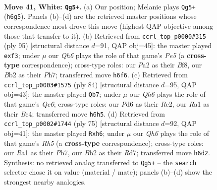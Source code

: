 \documentclass[11pt]{article}
\begin{document}
\clearpage

\begin{figure}[p]\centering
\begin{subfigure}{0.46\textwidth}\centering
\resizebox{\linewidth}{!}{%
\newchessgame
\chessboard[
  setfen={3q2k1/1b1n1p2/3P1n1Q/2p4p/p6P/5pP1/PB6/R5K1 w - - 2 41},
  showmover=false,
  pgfstyle=straightmove, color=movearrow, markmove={h6-g5}
]}
\caption{}
\end{subfigure}\hfill
\begin{subfigure}{0.46\textwidth}\centering
\resizebox{\linewidth}{!}{%
\newchessgame
\chessboard[
  setfen={5bk1/7p/3p4/3P3p/3Qpp2/2B2N2/r3qPP1/4N1K1 b - - 1 48},
  showmover=false,
  pgfstyle=straightmove, color=movearrow, markmove={e4-f3}
]}
\caption{}
\end{subfigure}
\\[4pt]
\begin{subfigure}{0.46\textwidth}\centering
\resizebox{\linewidth}{!}{%
\newchessgame
\chessboard[
  setfen={8/q3bpk1/P1Q2np1/4p3/1PB1n2p/8/2R3PP/1K6 w - - 0 43},
  showmover=false,
  pgfstyle=straightmove, color=movearrow, markmove={c6-b7}
]}
\caption{}
\end{subfigure}\hfill
\begin{subfigure}{0.46\textwidth}\centering
\resizebox{\linewidth}{!}{%
\newchessgame
\chessboard[
  setfen={3k4/1p1r4/p3bp1B/4n3/P3N2r/2P5/1PQN1P2/5K2 b - - 0 38},
  showmover=false,
  pgfstyle=straightmove, color=movearrow, markmove={h4-h6}
]}
\caption{}
\end{subfigure}
\caption{\textbf{Move 41, White: \texttt{Qg5+}.} (a) Our position; Melanie plays \texttt{Qg5+} (\texttt{h6g5}). Panels (b)--(d) are the retrieved master positions whose correspondence most drove this move (highest QAP objective among those that transfer to it). (b) Retrieved from \texttt{ccrl\_top\_p0000\#315} (ply 95) [structural distance $d$=91, QAP obj=45]: the master played \texttt{exf3}; under $\mu$ our \emph{Qh6} plays the role of that game's \emph{Pe5} (a \textbf{cross-type} correspondence); cross-type roles: our \emph{P}a2 as their \emph{B}f8, our \emph{B}b2 as their \emph{P}h7; transferred move \texttt{h6f6}. (c) Retrieved from \texttt{ccrl\_top\_p0003\#1575} (ply 84) [structural distance $d$=95, QAP obj=43]: the master played \texttt{Qb7}; under $\mu$ our \emph{Qh6} plays the role of that game's \emph{Qc6}; cross-type roles: our \emph{P}d6 as their \emph{R}c2, our \emph{R}a1 as their \emph{B}c4; transferred move \texttt{h6h5}. (d) Retrieved from \texttt{ccrl\_top\_p0002\#1744} (ply 75) [structural distance $d$=92, QAP obj=41]: the master played \texttt{Rxh6}; under $\mu$ our \emph{Qh6} plays the role of that game's \emph{Rh5} (a \textbf{cross-type} correspondence); cross-type roles: our \emph{R}a1 as their \emph{P}b7, our \emph{B}b2 as their \emph{R}d7; transferred move \texttt{h6d2}. Synthesis: no retrieved analog transferred to \texttt{Qg5+} -- the \texttt{search} selector chose it on value (material / mate); panels (b)--(d) show the strongest nearby analogies.}
\label{fig:thought-m80}
\end{figure}
\end{document}

